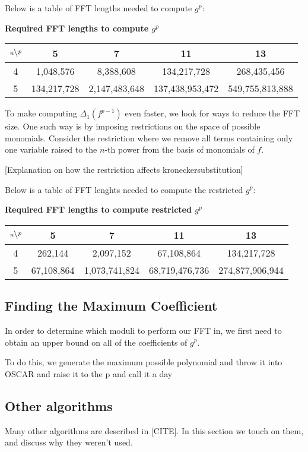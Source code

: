 Below is a table of FFT lengths needed to compute $g^p$:


\begin{center}
    \textbf{Required FFT lengths to compute $g^p$}
    \begin{tabular}{c|c|c|c|c}
    $\bsfrac{\,p}{n}$ & 5 & 7 & 11 & 13 \\ \hline
    4 & 1,048,576 & 8,388,608 & 134,217,728 & 268,435,456 \\
    5 & 134,217,728 & 2,147,483,648 & 137,438,953,472 & 549,755,813,888
    \end{tabular}
\end{center}    

To make computing $\Delta_1(f^{p-1})$ even faster, we look for ways to reduce the FFT size. One such way is by imposing restrictions on the space of possible monomials. Consider the restriction where we remove all terms containing only one variable raised to the $n$-th power from the basis of monomials of $f$.

[Explanation on how the restriction affects kroneckersubstitution]

Below is a table of FFT lenghts needed to compute the restricted $g^p$:


\begin{center}
    \textbf{Required FFT lengths to compute restricted $g^p$}
    \begin{tabular}{c|c|c|c|c}
    $\bsfrac{\,p}{n}$ & 5 & 7 & 11 & 13 \\ \hline
    4 & 262,144 & 2,097,152 & 67,108,864 & 134,217,728 \\
    5 & 67,108,864 & 1,073,741,824 & 68,719,476,736 & 274,877,906,944
    \end{tabular}
\end{center}


\subsection{Finding the Maximum Coefficient}
In order to determine which moduli to perform our FFT in, we first need to obtain an upper bound on all of 
the coefficients of $g ^ p$.

To do this, we generate the maximum possible polynomial and throw it into OSCAR and raise it to the p and call it a day

\subsection{Other algorithms}
Many other algorithms are described in [CITE]. In this section we touch on them, and discuss why they
weren't used.

